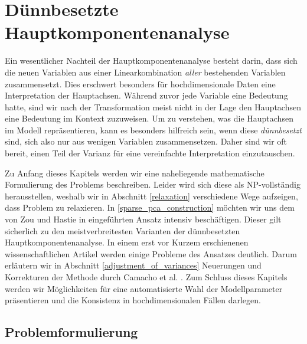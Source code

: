 \chapter{Dünnbesetzte Hauptkomponentenanalyse}

\label{sparse_pca}

Ein wesentlicher Nachteil der Hauptkomponentenanalyse besteht darin, dass sich die neuen Variablen aus einer Linearkombination \textit{aller} bestehenden Variablen zusammensetzt. Dies erschwert besonders für hochdimensionale Daten eine Interpretation der Hauptachsen. Während zuvor jede Variable eine Bedeutung hatte, sind wir nach der Transformation meist nicht in der Lage den Hauptachsen eine Bedeutung im Kontext zuzuweisen. Um zu verstehen, was die Hauptachsen im Modell repräsentieren, kann es besonders hilfreich sein, wenn diese \textit{dünnbesetzt} sind, sich also nur aus wenigen Variablen zusammensetzen. Daher sind wir oft bereit, einen Teil der Varianz für eine vereinfachte Interpretation einzutauschen.

Zu Anfang dieses Kapitels werden wir eine naheliegende mathematische Formulierung des Problems beschreiben. Leider wird sich diese als NP-vollständig herausstellen, weshalb wir in Abschnitt \ref{relaxation} verschiedene Wege aufzeigen, dass Problem zu relaxieren. In \ref{sparse_pca_construction} möchten wir uns dem von Zou und Hastie in \cite{zou_sparsepca} eingeführten Ansatz intensiv beschäftigen. Dieser gilt sicherlich zu den meistverbreitesten Varianten der dünnbesetzten Hauptkomponentenanalyse. In einem erst vor Kurzem erschienenen wissenschaftlichen Artikel werden einige Probleme des Ansatzes deutlich. Darum erläutern wir in Abschnitt \ref{adjustment_of_variances} Neuerungen und Korrekturen der Methode durch Camacho et al. \cite{camacho}. Zum Schluss dieses Kapitels werden wir Möglichkeiten für eine automatisierte Wahl der Modellparameter präsentieren und die Konsistenz in hochdimensionalen Fällen darlegen.




\section{Problemformulierung}
\label{problem_formulation}

